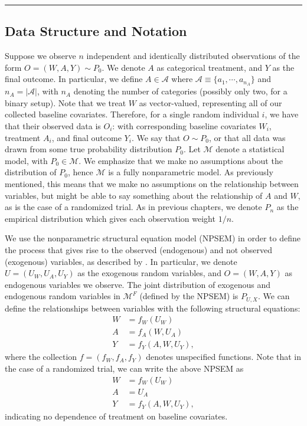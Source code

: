 \documentclass[12pt, krantz2,]{krantz}
\theoremstyle{definition}
\theoremstyle{definition}
\theoremstyle{definition}
\newcommand{\1}{\mathbbm{1}}
\begin{document}
\begin{center}\rule{0.5\linewidth}{0.5pt}\end{center}

\hypertarget{data-structure-and-notation}{%
\subsection{Data Structure and Notation}\label{data-structure-and-notation}}

Suppose we observe \(n\) independent and identically distributed observations of
the form \(O=(W,A,Y) \sim P_0\). We denote \(A\) as categorical treatment, and \(Y\)
as the final outcome. In particular, we define \(A \in \mathcal{A}\) where
\(\mathcal{A} \equiv \{a_1, \cdots, a_{n_A} \}\) and \(n_A = |\mathcal{A}|\), with
\(n_A\) denoting the number of categories (possibly only two, for a binary setup).
Note that we treat \(W\) as vector-valued, representing all of our collected
baseline covariates. Therefore, for a single random individual \(i\), we have that
their observed data is \(O_i\): with corresponding baseline covariates \(W_i\),
treatment \(A_i\), and final outcome \(Y_i\). We say that \(O \sim P_0\), or that all
data was drawn from some true probability distribution \(P_0\). Let \(\mathcal{M}\)
denote a statistical model, with \(P_0 \in \mathcal{M}\). We emphasize that we
make no assumptions about the distribution of \(P_0\), hence \(\mathcal{M}\) is a
fully nonparametric model. As previously mentioned, this means that we make no
assumptions on the relationship between variables, but might be able to say
something about the relationship of \(A\) and \(W\), as is the case of a randomized
trial. As in previous chapters, we denote \(P_n\) as the empirical distribution
which gives each observation weight \(1/n\).

We use the nonparametric structural equation model (NPSEM) in order to define
the process that gives rise to the observed (endogenous) and not observed
(exogenous) variables, as described by \citet{pearl2009causality}. In particular, we
denote \(U=(U_W,U_A,U_Y)\) as the exogenous random variables, and \(O=(W,A,Y)\) as
endogenous variables we observe. The joint distribution of exogenous and
endogenous random variables in \(\mathcal{M}^F\) (defined by the NPSEM) is
\(P_{U,X}\). We can define the relationships between variables with the following
structural equations:
\begin{align}
  W &= f_W(U_W) \\ A &= f_A(W, U_A) \\ Y &= f_Y(A, W, U_Y),
  \label{eq:npsem-mopttx}
\end{align}
where the collection \(f=(f_W,f_A,f_Y)\) denotes unspecified functions. Note that
in the case of a randomized trial, we can write the above NPSEM as
\begin{align}
  W &= f_W(U_W) \\ A &= U_A \\ Y &= f_Y(A, W, U_Y),
  \label{eq:npsem-rt-mopttx}
\end{align}
indicating no dependence of treatment on baseline covariates.
\end{document}
